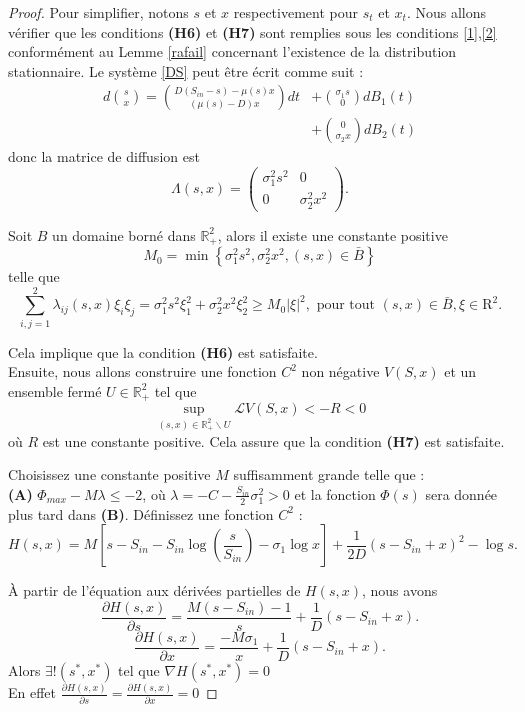 \documentclass[12pt,a4paper]{report}%
\begin{document}
\begin{proof}
	Pour simplifier, notons \( s \) et \( x \) respectivement pour \( s_t \) et \( x_t \). Nous allons vérifier que les conditions {\bf (H6) }et {\bf (H7)} sont remplies sous les conditions \eqref{1},\eqref{2} conformément au Lemme \ref{rafail} concernant l'existence de la distribution stationnaire. Le système \eqref{DS} peut être écrit comme suit :
	$$
	\begin{aligned}
		d\binom{s}{x}=\binom{D\left(S_{in}-s\right)-\mu(s) x}{(\mu(s)-D)x} d t & +\binom{\sigma_1 s}{0} d B_1(t) \\
		& +\binom{0}{\sigma_2 x} d B_2(t)
	\end{aligned}
	$$
	donc la matrice de diffusion est
	$$
	\Lambda(s, x)=\left(\begin{array}{ll}
		\sigma_1^2 s^2 & 0 \\
		0 & \sigma_2^2 x^2
	\end{array}\right) .
	$$
	
	Soit \( B \) un domaine borné dans \(\mathbb{R}_{+}^2\), alors il existe une constante positive $$
	M_0=\min \left\{\sigma_1^2 s^2\right., \left.\sigma_2^2 x^2,(s, x) \in \bar{B}\right\} 
	$$
	telle que
	$$
	\sum_{i, j=1}^2 \lambda_{i j}(s, x) \xi_i \xi_j=\sigma_1^2 s^2 \xi_1^2+\sigma_2^2 x^2 \xi_2^2 \geq M_0|\xi|^2, \text { pour tout }(s, x) \in \bar{B}, \xi \in \mathrm{R}^2 .
	$$
	
	Cela implique que la condition {\bf (H6)} est satisfaite.\\
	Ensuite, nous allons construire une fonction \(C^2\) non négative \( V(S, x) \) et un ensemble fermé \( U \in \mathbb{R}_{+}^2 \) tel que
	$$
	\sup _{(s, x) \in \mathbb{R}_{+}^2 \backslash U} \mathcal{L} V(S, x)<-R<0
	$$
	où \( R \) est une constante positive. Cela assure que la condition {\bf (H7)} est satisfaite.
	
	Choisissez une constante positive \( M \) suffisamment grande telle que : \\
	{\bf (A)} \(\Phi_{max} - M \lambda \leq -2\), où \(\lambda = -C - \frac{S_{in}}{2} \sigma_1^2 > 0\) et la fonction \(\Phi(s)\) sera donnée plus tard dans {\bf (B)}. Définissez une fonction \(C^2\) :
	$$
	H(s, x) = M\left[s - S_{in} - S_{in} \log( \frac{s}{S_{in}}) - \sigma_1 \log x\right] + \frac{1}{2D}\left(s - S_{in} +  x \right)^2 - \log s .
	$$
	
	À partir de l'équation aux dérivées partielles de \(H(s, x)\), nous avons
	$$
	\frac{\partial H(s, x)}{\partial s} = \frac{M(s-S_{in})-1}{s} + \frac{1}{D}\left(s - S_{in} +  x \right).
	$$
	$$
	\frac{\partial H(s, x)}{\partial x} = \frac{-M \sigma_1}{x} + \frac{1}{D}\left(s - S_{in} +  x \right).
	$$
	Alors $\exists !(s^*,x^*)$ tel que  $\nabla H(s^*,x^*)=0$\\
	En effet 
	$\frac{\partial H(s, x)}{\partial s}=\frac{\partial H(s, x)}{\partial x}=0$
	

\end{proof}
\end{document}
